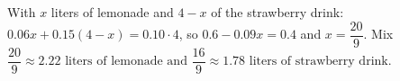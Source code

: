 With $x$ liters of lemonade and $4-x$ of the strawberry drink: $0.06x+0.15(4-x)=0.10\cdot4$, so $0.6-0.09x=0.4$ and $x=\dfrac{20}9$. Mix $\boxed{\dfrac{20}{9}\approx2.22\text{ liters of lemonade and }\dfrac{16}{9}\approx1.78\text{ liters of strawberry drink}}$.
